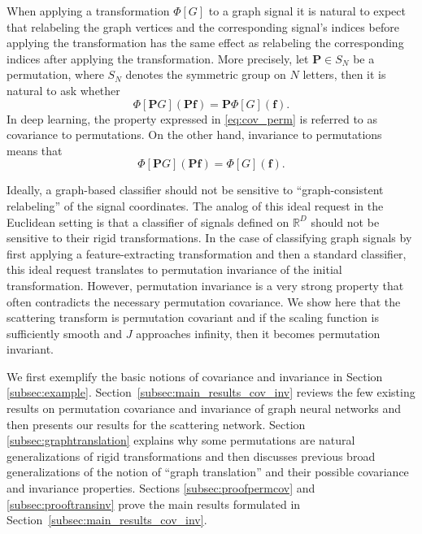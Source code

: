 \documentclass{article}
\def\RR{\mathbb{R}}
\def\BP{\boldsymbol{P}}
\def\Bf{\boldsymbol{f}}
\begin{document}
When applying a transformation $\Phi[G]$ to a graph signal it is natural to expect that relabeling the graph vertices and the corresponding signal's indices before applying the transformation has the same effect as relabeling the corresponding indices after applying the transformation. More precisely, let $\BP \in S_N$ be a permutation, where $S_N$ denotes the symmetric group on $N$ letters, then it is natural to ask whether  
\begin{equation}
\label{eq:cov_perm}
\Phi[\BP G](\BP \Bf) = \BP \Phi[G](\Bf). 
\end{equation}
In deep learning, the property expressed in \eqref{eq:cov_perm} is referred to as covariance to permutations. On the other hand, invariance to permutations means that  
\begin{equation}
\label{eq:inv_perm}
\Phi[\BP G] (\BP \Bf) = \Phi[G] (\Bf).
\end{equation}

Ideally, a graph-based classifier should not be sensitive to ``graph-consistent relabeling'' of the signal coordinates. The analog of this ideal request in the Euclidean setting is that a classifier of signals defined on $\RR^D$ should not be sensitive to their {rigid transformations}. In the case of classifying graph signals by first applying a feature-extracting transformation and then a standard classifier,  this ideal request translates to permutation invariance of the initial transformation. However, permutation invariance is a very strong property that often contradicts the necessary permutation covariance. We show here that the scattering transform is permutation covariant and if the scaling function is sufficiently smooth and $J$ approaches infinity, then it becomes permutation invariant. 

We first exemplify the basic notions of covariance and invariance in Section \ref{subsec:example}. Section~\ref{subsec:main_results_cov_inv} reviews the few existing results on permutation covariance and invariance of graph neural networks and then presents our results for the scattering network.  
{Section \ref{subsec:graphtranslation} explains why some permutations are natural generalizations of rigid transformations and then discusses previous broad generalizations of the notion of ``graph translation'' and their possible covariance and invariance properties.}
Sections \ref{subsec:proofpermcov} and \ref{subsec:prooftransinv} prove the main results formulated in Section~\ref{subsec:main_results_cov_inv}.
\end{document}
